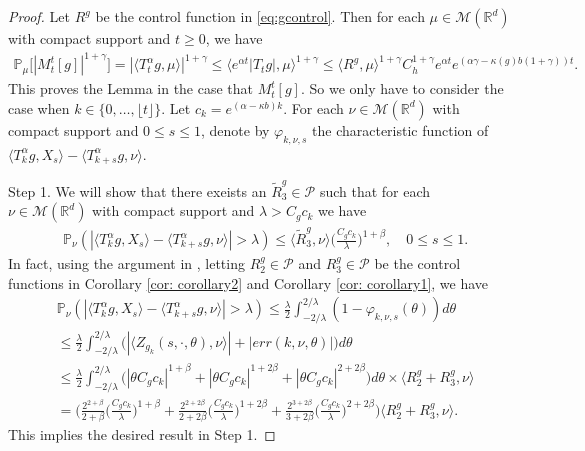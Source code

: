 \documentclass[12pt, a4paper]{amsart}
\theoremstyle{definition}
\numberwithin{equation}{section}
\begin{document}
\begin{proof}
    Let $R^g$ be the control function in \eqref{eq:gcontrol}.
    Then for each $\mu\in \mathcal M(\mathbb R^d)$ with compact support and $t\geq 0$, we have
\begin{align}
    \mathbb P_\mu\big[|M_t^t[g]|^{1+\gamma}\big]
    = |\langle T_t^\alpha g, \mu\rangle|^{1+\gamma}
    \leq \langle e^{\alpha t} |T_tg|, \mu\rangle^{1+\gamma}
    \leq  \langle R^g,\mu\rangle^{1+\gamma} C_h^{1+\gamma}e^{\alpha t} e^{(\alpha\gamma- \kappa(g)b(1+\gamma))t}.
\end{align}
    This proves the Lemma in the case that $M_t^t[g]$.
    So we only have to consider the case when $k \in \{0,\dots,\lfloor t \rfloor\}$.
    Let $c_k=e^{(\alpha-\kappa b)k}$.
    For each $\nu \in \mathcal M(\mathbb R^d)$ with compact support and $0\leq s\leq 1$, denote by $\varphi_{k,\nu,s}$ the characteristic function of $\langle T_k^{\alpha}g, X_s\rangle-\langle T_{k+s}^{\alpha}g,\nu\rangle$.

    Step 1. We will show that there exeists an $\tilde R^g_3 \in \mathcal P$ such that for each $\nu \in \mathcal M(\mathbb R^d)$ with compact support and $\lambda > C_g c_k$ we have
\begin{align}
    &\mathbb{P}_{\nu}(|\langle T_k^{\alpha}g, X_s\rangle-\langle T_{k+s}^{\alpha}g,\nu\rangle|>\lambda)
    \leq \langle \tilde R^g_3,\nu\rangle \Big(\frac{C_g c_k}{\lambda}\Big)^{1+\beta}, \quad 0\leq s \leq 1.
\end{align}
    In fact, using the argument in \cite[Proof of Theorem 3.3.6]{Durrett2010Probability}, letting $R^g_2 \in \mathcal P$ and $R^g_3 \in \mathcal P$ be the control functions in Corollary \ref{cor: corollary2} and Corollary \ref{cor: corollary1}, we have
\begin{align}
    &\mathbb{P}_{\nu}(|\langle T_k^{\alpha}g, X_s\rangle-\langle T_{k+s}^{\alpha}g,\nu\rangle|>\lambda)
    \leq \frac{\lambda}{2}\int_{-2/\lambda}^{2/\lambda}(1-\varphi_{k,\nu,s}(\theta))d\theta
    \\&\leq \frac{\lambda}{2}\int_{-2/\lambda}^{2/\lambda}\big(|\langle Z_{g_k}(s,\cdot,\theta),\nu\rangle|+|err(k,\nu,\theta)|\big)d\theta
    \\&\leq \frac{\lambda}{2}\int_{-2/\lambda}^{2/\lambda}\big(|\theta C_g c_k|^{1+\beta}+|\theta C_g c_k|^{1+2\beta}+ |\theta C_g c_k|^{2+2\beta}\big)d\theta \times \langle R^g_2+R^g_3,\nu\rangle
    \\& = \bigg(\frac{2^{2+\beta}}{2+\beta}\Big(\frac{C_g c_k}{\lambda}\Big)^{1+\beta}+\frac{2^{2+2\beta}}{2+2\beta}\Big(\frac{C_g c_k}{\lambda}\Big)^{1+2\beta} + \frac{2^{3+2\beta}}{3+2\beta}\Big(\frac{C_g c_k}{\lambda}\Big)^{2+2\beta}\bigg) \langle R^g_2+R^g_3,\nu\rangle.
\end{align}
    This implies the desired result in Step 1.


\end{proof}
\end{document}
